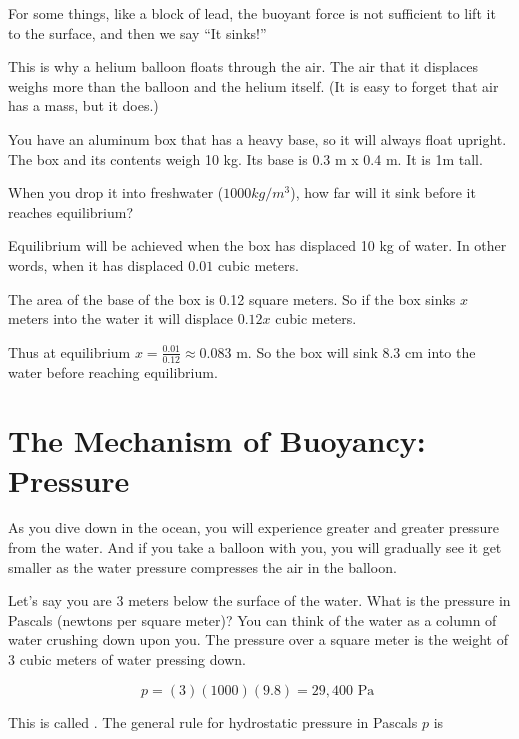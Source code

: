 For some things, like a block of lead, the buoyant force is not
 sufficient to lift it to the surface, and then we say ``It sinks!''

This is why a helium balloon floats through the air. The air
that it displaces weighs more than the balloon and the helium itself. (It is easy to forget that air has a mass, but it does.)

\begin{Exercise}[title={Buoyancy}, label=buoyancy]
  You have an aluminum box that has a heavy base, so it will always
  float upright. The box and its contents weigh 10 kg. Its base is 0.3 m x 0.4 m. It is 1m tall.

  When you drop it into freshwater ($1000 kg/m^3$), how far will it sink
  before it reaches equilibrium?

\end{Exercise}
\begin{Answer}[ref=buoyancy]
  Equilibrium will be achieved when the box has displaced 10 kg of water. In other words, when it has displaced $0.01$ cubic meters.

  The area of the base of the box is 0.12 square meters. So if the
  box sinks $x$ meters into the water it will displace $0.12 x$ cubic
  meters.

  Thus at equilibrium $x = \frac{0.01}{0.12} \approx 0.083$ m. So
  the box will sink 8.3 cm into the water before reaching equilibrium.
\end{Answer}

\section{The Mechanism of Buoyancy: Pressure}

As you dive down in the ocean, you will experience greater and
greater pressure from the water. And if you take a balloon with you, you
will gradually see it get smaller as the water pressure compresses the
air in the balloon.

Let's say you are 3 meters below the surface of the water. What is the
pressure in Pascals (newtons per square meter)? You can think of the
water as a column of water crushing down upon you. The pressure over
a square meter is the weight of 3 cubic meters of water pressing down.

$$p = (3)(1000)(9.8) = 29,400 \text{ Pa }$$

This is called . The general rule for
hydrostatic pressure in Pascals $p$ is

